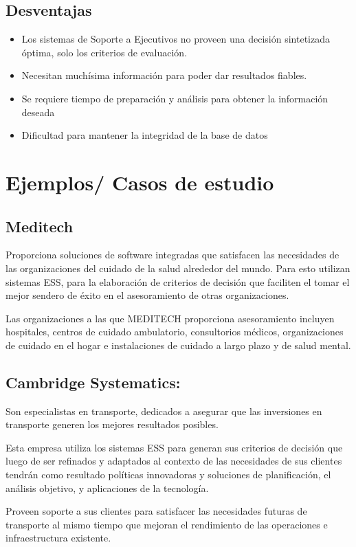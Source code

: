 \subsection{Desventajas}
\begin{itemize}
\item Los sistemas de Soporte a Ejecutivos no proveen una decisión sintetizada óptima, solo los criterios de evaluación. 
\item Necesitan muchísima información para poder dar resultados fiables.
\item Se requiere tiempo de preparación y análisis para obtener la información deseada 
\item Dificultad para mantener la integridad de la base de datos 
\end{itemize}

\section {Ejemplos/ Casos de estudio}
\subsection {Meditech} 
Proporciona soluciones de software integradas que satisfacen las necesidades de las organizaciones del cuidado de la salud alrededor del mundo. Para esto utilizan sistemas ESS, para la elaboración de criterios de decisión que faciliten el tomar el mejor sendero de éxito en el asesoramiento de otras organizaciones.

Las organizaciones a las que MEDITECH proporciona asesoramiento incluyen hospitales, centros de cuidado ambulatorio, consultorios médicos, organizaciones de cuidado en el hogar e instalaciones de cuidado a largo plazo y de salud mental.

\subsection {Cambridge Systematics:} Son especialistas en transporte, dedicados a asegurar que las inversiones en transporte generen los mejores resultados posibles.

Esta empresa utiliza los sistemas ESS para generan sus criterios de decisión que luego de ser refinados y adaptados al contexto de las necesidades de sus clientes tendrán como resultado políticas innovadoras y soluciones de planificación, el análisis objetivo, y aplicaciones de la tecnología.

Proveen soporte a sus clientes para satisfacer las necesidades futuras de transporte al mismo tiempo que mejoran el rendimiento de las operaciones e infraestructura existente.
